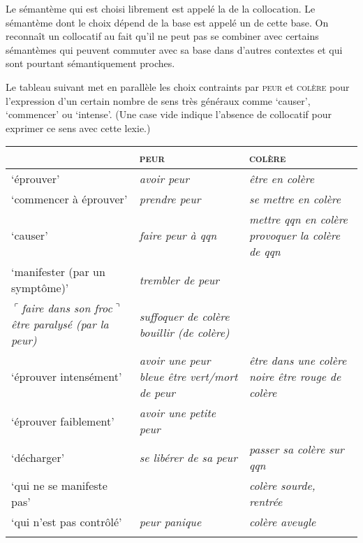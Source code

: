 \begin{styleLivreImportant}
Le sémantème qui est choisi librement est appelé la  de la collocation. Le sémantème dont le choix dépend de la base est appelé un  de cette base. On reconnaît un collocatif au fait qu’il ne peut pas se combiner avec certains sémantèmes qui peuvent commuter avec sa base dans d’autres contextes et qui sont pourtant sémantiquement proches.
\end{styleLivreImportant}

Le tableau suivant met en parallèle les choix contraints par \textsc{peur} et \textsc{colère} pour l’expression d’un certain nombre de sens très généraux comme ‘causer’, ‘commencer’ ou ‘intense’. (Une case vide indique l’absence de collocatif pour exprimer ce sens avec cette lexie.)

\begin{tabularx}{\textwidth}{XXX}
\lsptoprule
 & {\scshape peur} & {\scshape colère}\\
 \midrule
‘éprouver’ & {\itshape avoir peur} & {\itshape être en colère}\\
‘commencer à éprouver’ & {\itshape prendre peur} & {\itshape se mettre en colère}\\
‘causer’ & {\itshape faire peur à qqn} & {\itshape mettre qqn en colère} {\itshape provoquer la colère de qqn}\\
‘manifester (par un symptôme)’ & \textit{trembler de peur}\\
$⌜$\textit{faire dans son froc}$⌝$ {\itshape être paralysé (par la peur)} & {\itshape suffoquer de colère bouillir (de colère)}\\
‘éprouver intensément’ & {\itshape avoir une peur bleue être vert/mort de peur} & {\itshape être dans une colère noire être rouge de colère}\\
‘éprouver faiblement’ & {\itshape avoir une petite peur} & \\
‘décharger’ & {\itshape se libérer de sa peur} & {\itshape passer sa colère sur qqn}\\
‘qui ne se manifeste pas’ &  & {\itshape colère sourde, rentrée}\\
‘qui n’est pas contrôlé’ & {\itshape peur panique} & {\itshape colère aveugle}\\
\lspbottomrule
\end{tabularx}

